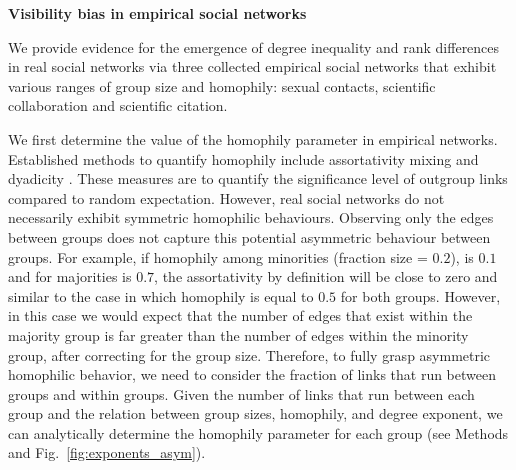 \noindent \textbf{Visibility bias in empirical social networks}




\noindent We provide evidence for the emergence of degree inequality and rank differences in real social networks via three collected empirical social networks that exhibit various ranges of group size and homophily: sexual contacts, scientific collaboration and scientific citation.



We first determine the value of the homophily parameter in empirical networks. Established methods to quantify homophily include assortativity mixing \cite{newman2003mixing} and dyadicity \cite{park2007distribution}. These measures are to quantify the significance level of outgroup links compared to random expectation. However, real social networks do not necessarily exhibit symmetric homophilic behaviours. Observing only the edges between groups does not capture this potential asymmetric behaviour between groups. For example, if homophily among minorities (fraction size = $0.2$), is $0.1$ and for majorities is $0.7$, the assortativity by definition will be close to zero and similar to the case in which homophily is equal to $0.5$ for both groups. However, in this case we would expect that the number of edges that exist within the majority group is far greater than the number of edges within the minority group, after correcting for the group size. Therefore, to fully grasp asymmetric homophilic behavior, we need to consider the fraction of links that run between groups and within groups. Given the number of links that run between each group and the relation between group sizes, homophily, and degree exponent, we can analytically determine the homophily parameter for each group (see Methods and Fig.~\ref{fig:exponents_asym}).




